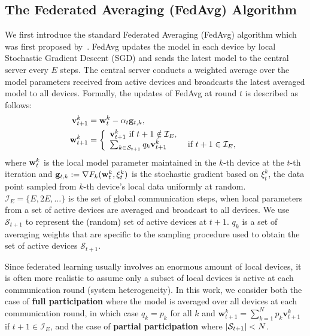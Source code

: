 \subsection{The Federated Averaging (FedAvg) Algorithm}
We first introduce the standard Federated Averaging (FedAvg)  algorithm which was first proposed by~\cite{mcmahan2016communication}.
FedAvg updates the model in each device by local Stochastic Gradient Descent (SGD) and sends the latest model to the central server every $E$
steps. The central server conducts a weighted average over the model parameters
received from active devices and broadcasts the latest averaged model to all devices.
Formally, the updates of FedAvg at round $t$ is described as follows:
\begin{align}
\label{eq:fedavg updates}
\vv_{t+1}^{k} & =\vw_{t}^{k}-\alpha_{t}\vg_{t,k}, \nonumber\\
\mathbf{w}_{t+1}^{k} & =\left\{
\begin{array}{ll}
\mathbf{v}_{t+1}^{k}  \text { if } t+1 \notin \mathcal{I}_{E}, \\ 
\sum_{k \in \cS_{t+1}} q_k \mathbf{v}_{t+1}^{k} & \text { if } t+1 \in \mathcal{I}_{E},
\end{array}\right.
\end{align}
where ${\mathbf{w}}_t^k$ is the local model parameter maintained in the $k$-th device at the $t$-th iteration and ${\mathbf{g}}_{t,k}:=\nabla F_{k}({\mathbf{w}}_{t}^{k},\xi_{t}^{k})$ is the stochastic gradient based on $\xi_{t}^{k}$, the data point sampled from $k$-th device’s local data uniformly at random. $\mathcal{I}_{E}=\{E,2E,\dots\}$ is the set of global communication steps, when local parameters from a set of active devices are averaged and broadcast to all devices. We use $\mathcal{S}_{t+1}$ to represent the (random) set of active devices at $t+1$. $q_k$ is a set of averaging weights that are specific to the sampling procedure used to obtain the set of active devices $\mathcal{S}_{t+1}$.

Since federated learning usually involves an enormous amount of 
local devices, it is often more realistic to assume only a subset of 
local devices is active at each communication round (system heterogeneity). In this work,
we consider both the case of \textbf{full participation} where the model is
averaged over all devices at each communication round, in which case $q_k=p_k$ for all $k$ and 
$\mathbf{w}_{t+1}^{k} = \sum_{k=1}^N p_k \mathbf{v}_{t+1}^{k}$ if $t+1 \in \mathcal{I}_{E}$, and
the case of \textbf{partial participation} where $|{\mathcal{S}}_{t+1}| < N$. 

